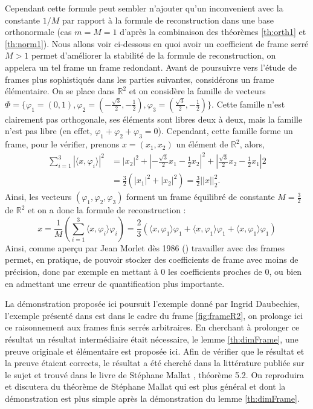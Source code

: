 Cependant cette formule peut sembler n'ajouter qu'un inconvenient avec la constante $1/M$ par rapport à la formule de reconstruction dans une base orthonormale (cas $m=M=1$ d'après la combinaison des théorèmes \ref{th:orth1} et \ref{th:norm1}). 
Nous allons voir ci-dessous en quoi avoir un coefficient de frame serré $M>1$ permet d'améliorer la stabilité de la formule de reconstruction, on appelera un tel frame un frame redondant.
\newline
Avant de poursuivre vers l'étude de frames plus sophistiqués dans les parties suivantes, considérons un frame élémentaire.
	On se place dans $\mathbb{R}^2$ et on considère la famille de vecteurs $\Phi= \{\varphi_1 = (0, 1), \varphi_2 = (-\frac{\sqrt{3}}{2}, -\frac{1}{2}), \varphi_3 =(\frac{\sqrt{3}}{2}, -\frac{1}{2})\}$.
	Cette famille n'est clairement pas orthogonale, ses éléments sont libres deux à deux, mais la famille n'est pas libre (en effet, $\varphi_1 +\varphi_2 +\varphi_3 = 0$).
	Cependant, cette famille forme un frame, pour le vérifier, prenons $x=(x_1, x_2)$ un élément de $\mathbb{R}^2$, alors,
	\begin{align*}
		\sum_{i=1}^3 |\langle x, \varphi_i \rangle|^2 &= |x_2|^2 + |-\frac{\sqrt{3}}{2}x_1 -\frac{1}{2} x_2|^2 + |\frac{\sqrt{3}}{2}x_2 - \frac{1}{2}x_1|2 \\
		&= \frac{3}{2}(|x_1|^2 + |x_2|^2) = \frac{3}{2} ||x||_2^2.
	\end{align*}
	Ainsi, les vecteurs $(\varphi_1, \varphi_2, \varphi_3)$ forment un frame équilibré de constante $M=\frac{3}{2}$ de $\mathbb{R}^2$ et on a donc la formule de reconstruction :
	\begin{equation}
		x = \frac{1}{M}( \sum_{i=1}^3 \langle x, \varphi_i \rangle \varphi_i) = \frac{2}{3}( \langle x, \varphi_1 \rangle \varphi_1 +  \langle x, \varphi_1 \rangle \varphi_1   + \langle x, \varphi_1 \rangle \varphi_1) 
	\end{equation}
Ainsi, comme aperçu par Jean Morlet dès 1986 (\cite{daubch3}) travailler avec des frames permet, en pratique, de pouvoir stocker des coefficients de frame avec moins de précision, donc par exemple en mettant à 0 les coefficients proches de 0, ou bien en admettant une erreur de quantification plus importante.
\begin{remarque}\label{rq:lemmemallat}
La démonstration proposée ici poursuit l'exemple donné par Ingrid Daubechies, l'exemple présenté dans \cite{daubch3} est dans le cadre du frame \ref{fig:frameR2}, on prolonge ici ce raisonnement aux frames finis serrés arbitraires.
En cherchant à prolonger ce résultat un résultat intermédiaire était nécessaire, le lemme \ref{th:dimFrame}, une preuve originale et élémentaire est proposée ici.
Afin de vérifier que le résultat et la preuve étaient corrects, le résultat a été cherché dans la littérature publiée sur le sujet et trouvé dans le livre de Stéphane Mallat \cite{mallatframe}, théorème 5.2.
On reproduira et discutera du théorème de Stéphane Mallat qui est plus général et dont la démonstration est plus simple après la démonstration du lemme \ref{th:dimFrame}.
\end{remarque}
